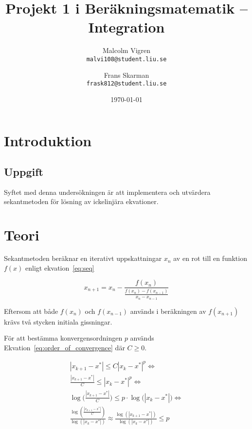 \documentclass[a4paper,titlepage]{article}
\title{
    \textbf{Projekt 1 i Beräkningsmatematik -- Integration }}
\date{\today}
\author{%
    Malcolm Vigren \\
    \texttt{malvi108@student.liu.se}
    \and
    Frans Skarman\\
    \texttt{frask812@student.liu.se}
    }
\begin{document}
\maketitle
\newpage
\tableofcontents
\newpage

\section{Introduktion}

\subsection{Uppgift}

Syftet med denna undersökningen är att implementera och utvärdera sekantmetoden
för lösning av ickelinjära ekvationer.


\section{Teori}

Sekantmetoden beräknar en iterativt uppskattningar $x_n$ av en rot till en
funktion $f(x)$ enligt ekvation~\ref{eq:seq}

\begin{equation}
    \label{eq:seq}
    x_{n+1} = x_{n} -
    \frac{f(x_n)}
        {\frac{f(x_n) - f(x_{n-1})}
                {x_n - x_{n-1}}
        }
\end{equation}

Eftersom att både $f(x_n)$ och $f(x_{n-1})$ används i beräkningen av $f(x_{n+1})$ krävs
två stycken initiala gissningar.


För att bestämma konvergensordningen $p$ används Ekvation~\ref{eq:order_of_convergence} där
$C \geq 0$.

\begin{equation}
    \begin{gathered}
        |x_{k+1} - x^*| \leq C |x_k - x^*|^p \Leftrightarrow \\
        \frac{|x_{k+1} - x^*|}{C} \leq |x_{k} - x^*|^p \Leftrightarrow \\
        \log\big(\frac{|x_{k+1} - x^*|}{C} \big) \leq
            p \cdot \log\big(|x_{k} - x^*|\big) \Leftrightarrow \\
        \frac{\log(\frac{|x_{k+1} - x^*|}{C})}
            {\log(|x_{k} - x^*|)}
        \approx \frac{\log(|x_{k+1} - x^*|)}
            {\log(|x_{k} - x^*|)} \leq p \\
    \end{gathered}
    \label{eq:order_of_convergence}
\end{equation}
\end{document}
